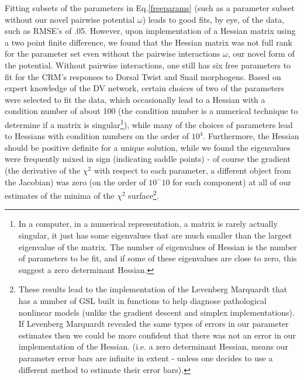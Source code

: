    Fitting subsets of the parameters in Eq.\ref{freeparams} (such as a parameter subset without our novel pairwise potential $\omega$) leads to good fits, by eye, of the data, such as RMSE's of .05.  However, upon implementation of a Hessian matrix using a two point finite difference, we found that the Hessian matrix was not full rank for the parameter set even without the pairwise interactions $\omega$, our novel form of the potential.  Without pairwise interactions, one still has six free parameters to fit for the CRM's responses to Dorsal Twist and Snail morphogens.  Based on expert knowledge of the DV network, certain choices of two of the parameters were selected to fit the data, which occasionally lead to a Hessian with a condition number of about 100 (the condition number is a numerical technique to determine if a matrix is singular\footnote{In a computer, in a numerical representation, a matrix is rarely actually singular, it just has some eigenvalues that are much smaller than the largest eigenvalue of the matrix.  The number of eigenvalues of Hessian is the number of parameters to be fit, and if some of these eigenvalues are close to zero, this suggest a zero determinant Hessian.}), while many of the choices of parameters lead to Hessians with condition numbers on the order of $10^4$.  Furthermore, the Hessian should be positive definite for a unique solution, while we found the eigenvalues were frequently mixed in sign (indicating saddle points) - of course the gradient (the derivative of the $\chi^2$ with respect to each parameter, a different object from the Jacobian) was zero (on the order of $10^-{10}$ for each component) at all of our estimates of the minima of the $\chi^2$ surface\footnote{These results lead to the implementation of the Levenberg Marquardt that has a number of GSL built in functions to help diagnose pathological nonlinear models (unlike the gradient descent and simplex implementations).  If Levenberg Marquardt revealed the same types of errors in our parameter estimates then we could be more confident that there was not an error in our implementation of the Hessian.  (i.e. a zero determinant Hessian, means our parameter error bars are infinite in extent - unless one decides to use a different method to estimate their error bars).}.
 

